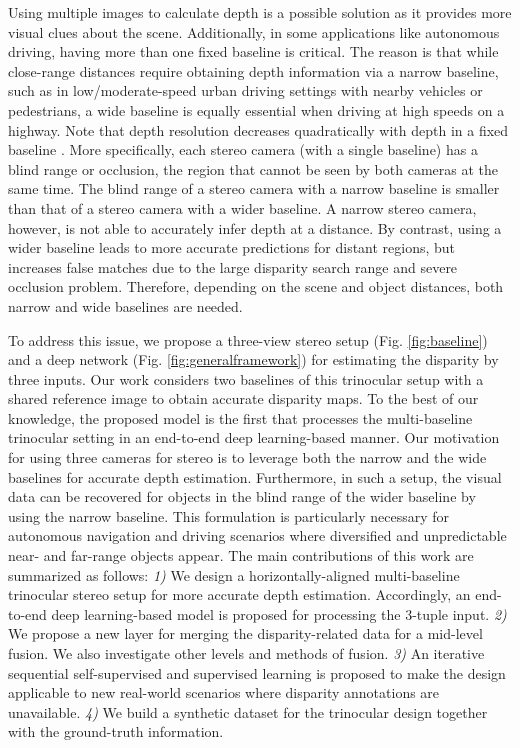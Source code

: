 \documentclass[10pt,twocolumn,letterpaper]{article}
\begin{document}
Using multiple images to calculate depth is a possible solution as it provides more visual clues about the scene. Additionally, in some applications like autonomous driving, having more than one fixed baseline is critical. The reason is that while close-range distances require obtaining depth information via a narrow baseline, such as in low/moderate-speed urban driving settings with nearby vehicles or pedestrians, a wide baseline is equally essential when driving at high speeds on a highway. Note that depth resolution decreases quadratically with depth in a fixed baseline \cite{gallup2008variable}. More specifically, each stereo camera (with a single baseline) has a blind range or occlusion, \ie the region that cannot be seen by both cameras at the same time. The blind range of a stereo camera with a narrow baseline is smaller than that of a stereo camera with a wider baseline. A narrow stereo camera, however, is not able to accurately infer depth at a distance. By contrast, using a wider baseline leads to more accurate predictions for distant regions, but increases false matches due to the large disparity search range and severe occlusion problem. Therefore, depending on the scene and object distances, both narrow and wide baselines are needed.  

To address this issue, we propose a three-view stereo setup (Fig. \ref{fig:baseline}) and a deep network (Fig. \ref{fig:generalframework}) for estimating the disparity by three inputs. Our work considers two baselines of this trinocular setup with a shared reference image to obtain accurate disparity maps. To the best of our knowledge, the proposed model is the first that processes the multi-baseline trinocular setting in an end-to-end deep learning-based manner. Our motivation for using three cameras for stereo is to leverage both the narrow and the wide baselines for accurate depth estimation. Furthermore, in such a setup, the visual data can be recovered for objects in the blind range of the wider baseline by using the narrow baseline. This formulation is particularly necessary for autonomous navigation and driving scenarios where diversified and unpredictable near- and far-range objects appear. The main contributions of this work are summarized as follows: \emph{1)} We design a horizontally-aligned multi-baseline trinocular stereo setup for more accurate depth estimation. Accordingly, an end-to-end deep learning-based model is proposed for processing the 3-tuple input. \emph{2)} We propose a new layer for merging the disparity-related data for a mid-level fusion. We also investigate other levels and methods of fusion. \emph{3)} An iterative sequential self-supervised and supervised learning is proposed to make the design applicable to new real-world scenarios where disparity annotations are unavailable. \emph{4)} We build a synthetic dataset for the trinocular design together with the ground-truth information.
\end{document}
